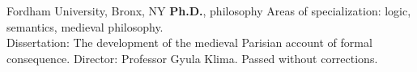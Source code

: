 {%
	Fordham University, Bronx, NY}
{%
	\textbf{Ph.D.}, philosophy}
{%
	Areas of specialization: logic, semantics, medieval philosophy.
	\\ Dissertation: The development of the medieval Parisian account of formal consequence. Director: Professor Gyula Klima. Passed without corrections.}
